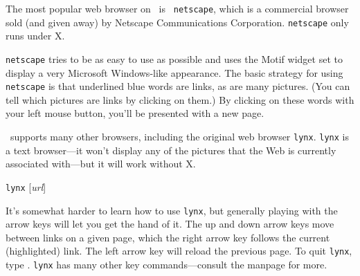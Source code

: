 \xwarn The most popular web browser on \linux\ is {\tt
  netscape}, which is a commercial browser sold (and
given away) by Netscape Communications Corporation.  {\tt netscape}
only runs under X.

{\tt netscape} tries to be as easy to use as possible and uses the
Motif widget set to display a very Microsoft Windows-like appearance.
The basic strategy for using {\tt netscape} is that underlined blue
words are links, as are many pictures.  (You can tell which pictures
are links by clicking on them.)  By clicking on these words with your
left mouse button, you'll be presented with a new page.

\linux\ supports many other browsers, including the original web
browser {\tt lynx}.  {\tt lynx} is a text browser---it
won't display any of the pictures that the Web is currently associated
with---but it will work without X.

\begin{command}
  {\tt lynx} [{\sl url}]
\end{command}

It's somewhat harder to learn how to use {\tt lynx}, but generally
playing with the arrow keys will let you get the hand of it.  The up
and down arrow keys move between links on a given page, which the
right arrow key follows the current (highlighted) link.  The left
arrow key will reload the previous page.  To quit {\tt lynx}, type
.  {\tt lynx} has many other key commands---consult the manpage
for more.


